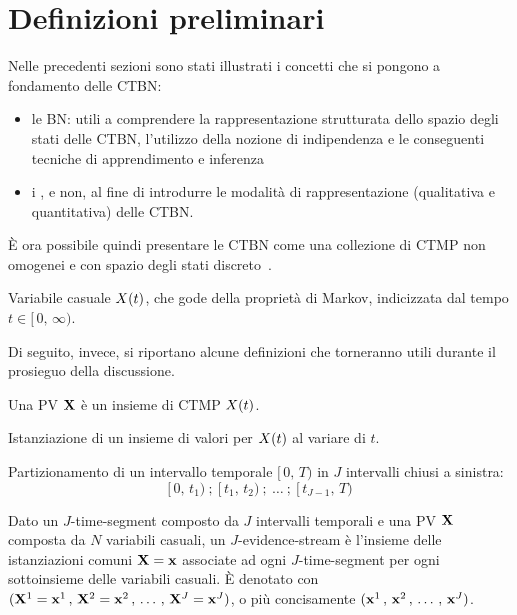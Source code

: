\section{Definizioni preliminari}
\label{sec:Definizioni preliminari}
Nelle precedenti sezioni sono stati illustrati i concetti che si pongono a fondamento delle \acl{CTBN}:
\begin{itemize}
    \item le \acl{BN}: utili a comprendere la rappresentazione strutturata dello spazio degli stati delle \acs{CTBN}, l'utilizzo della nozione di indipendenza \cond*{} e le conseguenti tecniche di apprendimento e inferenza
    \item i \mprocess{}, \omog{} e non, al fine di introdurre le modalità di rappresentazione (qualitativa e quantitativa) delle \acs{CTBN}.
\end{itemize}

\`E ora possibile quindi presentare le \acl{CTBN} come una collezione di \ac{CTMP} non omogenei e con spazio degli stati discreto~\cite{Nodelman2002}.

\begin{definizione}
Variabile casuale $\mathnormal{X}(t)$, che gode della proprietà di Markov, indicizzata dal tempo $t\in[\,0,\,\infty)$.
\end{definizione}

Di seguito, invece, si riportano alcune definizioni che torneranno utili durante il prosieguo della discussione.

\begin{definizione}[\ACL{PV}]
    Una \acf{PV} $\mathbf{X}$ è un insieme di \acl{CTMP} $\mathnormal{X}(t)$.
\end{definizione}

\begin{definizione}[Traiettoria]
    Istanziazione di un insieme di valori per $\mathnormal{X}(t)$ al variare di $t$.
\end{definizione}

\begin{definizione}
Partizionamento di un intervallo temporale $[\,0,\,T)$ in $J$ intervalli chiusi a sinistra:
\[
[\,0,\,t_1)\:;\:[\,t_1,\,t_2)\:;\:\dotsc\:;\:[\,t_{J-1},\,T)
\]
\end{definizione}

\begin{definizione}
Dato un $J$-time-segment composto da $J$ intervalli temporali e una \acl{PV} $\mathbf{X}$ composta da $N$ variabili casuali, un $J$-evidence-stream è l'insieme delle istanziazioni comuni $\mathbf{X}=\mathbf{x}$ associate ad ogni $J$-time-segment per ogni sottoinsieme delle variabili casuali. \`E denotato con $(\mathbf{X}^1=\mathbf{x}^1\,,\,\mathbf{X}^2=\mathbf{x}^2\,,\,\dotsc\,,\,\mathbf{X}^J=\mathbf{x}^J)$, o più concisamente $(\mathbf{x}^1\,,\,\mathbf{x}^2\,,\,\dotsc\,,\,\mathbf{x}^J)$.
\end{definizione}


